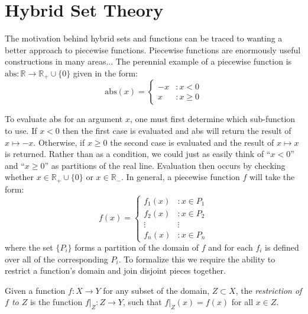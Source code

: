 \chapter{Hybrid Set Theory}


%
%


The motivation behind hybrid sets and functions can be traced to wanting a better approach to piecewise functions.
Piecewise functions are enormously useful constructions in many areas...
The perennial example of a piecewise function is $\mathrm{abs}:\mathbb{R} \to \mathbb{R}_{+} \cup \{ 0 \}$ given in the form:
\begin{equation}
	\mathrm{abs}(x) = 
  		\left\{
     			\begin{array}{lr}
       			-x & : x < 0 \\
       			x & : x \geq 0
     			\end{array}
   		\right.
\end{equation}


To evaluate abs for an argument $x$, one must first determine which sub-function to use. 
If $x < 0$ then the first case is evaluated and abs will return the result of $x \mapsto -x$. 
Otherwise, if $x \geq 0$ the second case is evaluated and the result of $x \mapsto x$ is returned. 
Rather than as a condition, we could just as easily think of ``$x<0$'' and ``$x \geq 0$'' as partitions of the real line.
Evaluation then occurs by checking whether $x\in \mathbb{R}_{+} \cup \{ 0 \} $ or $x \in \mathbb{R}_{-}$.
In general, a piecewise function $f$ will take the form:
\begin{equation}
\label{eq_fP}
	f(x) = 
	  \left\{
	     \begin{array}{lr}
	       f_1(x) & : x \in P_1 \\
	       f_2(x) & : x \in P_2 \\ 
	       \vdots & \vdots \\
	       f_n(x) & : x \in P_n
	     \end{array}
	   \right.
\end{equation}
where the set $\{ P _ i \}$ forms a partition of the domain of $f$ and for each $f_i$ is defined over all of the corresponding $P_i$. To formalize this we require the ability to restrict a function's domain and join disjoint pieces together.


\begin{definition}
	Given a function $f:X \to Y$ for any subset of the domain, 
	$Z \subset X$, the \emph{restriction of $f$ to $Z$} is the function $f|_Z : Z \to Y$, 
	such that $f|_Z(x) = f(x)$ for all $x \in Z$.
\end{definition}


